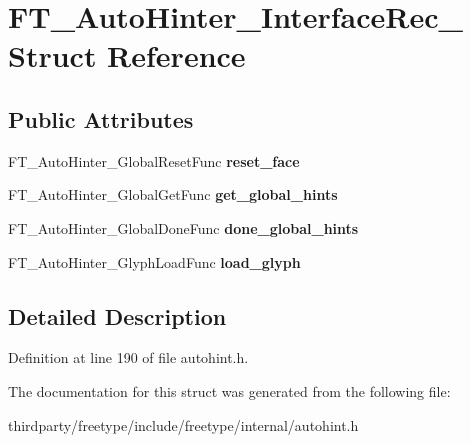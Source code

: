\hypertarget{struct_f_t___auto_hinter___interface_rec__}{}\section{F\+T\+\_\+\+Auto\+Hinter\+\_\+\+Interface\+Rec\+\_\+ Struct Reference}
\label{struct_f_t___auto_hinter___interface_rec__}
\subsection*{Public Attributes}
\begin{DoxyCompactItemize}
\item 
\mbox{\label{struct_f_t___auto_hinter___interface_rec___ac49b1bea5a33eb6475a16d8297c8dc56}} 
F\+T\+\_\+\+Auto\+Hinter\+\_\+\+Global\+Reset\+Func {\bfseries reset\+\_\+face}
\item 
\mbox{\label{struct_f_t___auto_hinter___interface_rec___aa406ff1153cf6cc4a31d3b6ece46311c}} 
F\+T\+\_\+\+Auto\+Hinter\+\_\+\+Global\+Get\+Func {\bfseries get\+\_\+global\+\_\+hints}
\item 
\mbox{\label{struct_f_t___auto_hinter___interface_rec___a1dd9c798f14a5eb0f56d101c448a24b7}} 
F\+T\+\_\+\+Auto\+Hinter\+\_\+\+Global\+Done\+Func {\bfseries done\+\_\+global\+\_\+hints}
\item 
\mbox{\label{struct_f_t___auto_hinter___interface_rec___a9a71f9a4163791de748426b0075bc402}} 
F\+T\+\_\+\+Auto\+Hinter\+\_\+\+Glyph\+Load\+Func {\bfseries load\+\_\+glyph}
\end{DoxyCompactItemize}


\subsection{Detailed Description}


Definition at line 190 of file autohint.\+h.



The documentation for this struct was generated from the following file\+:\begin{DoxyCompactItemize}
\item 
thirdparty/freetype/include/freetype/internal/autohint.\+h\end{DoxyCompactItemize}
